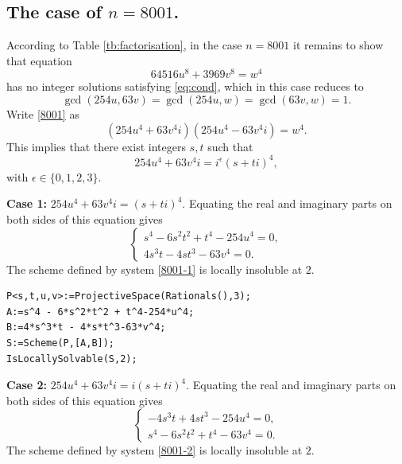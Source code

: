 \documentclass[a4paper,12pt,english,reqno]{amsart}
\begin{document}
\subsection{The case of $n=8001$.}%
 According to Table \ref{tb:factorisation}, in the case $n=8001$ it remains to
show that equation
\begin{equation}\label{8001}
64516 u^8 + 3969 v^8= w^4
\end{equation}
has no integer solutions satisfying \eqref{eq:cond}, which in this case reduces to  \[\gcd(254u,63v)=\gcd(254u,w)=\gcd(63v,w)=1.\]
Write \eqref{8001} as 
\begin{equation} (254u^4+63v^4i)(254u^4-63v^4i)=w^4.
\end{equation}
This implies that there exist integers $s,t$ such that 
\[254u^4+63v^4i=i^{\epsilon}(s+ti)^4,\]
with $\epsilon \in \{0,1,2,3\}$.


{\bf Case 1:} $254u^4+63v^4i=(s+ti)^4$. Equating the real and imaginary parts on both sides of this equation gives
\begin{equation}\label{8001-1}
\begin{cases}
s^4 - 6s^2t^2 + t^4 - 254u^4=0,\\
4s^3t - 4st^3 - 63v^4=0.
\end{cases}
\end{equation}
The scheme defined by system \eqref{8001-1} is locally insoluble at $2$.


\begin{lstlisting}
P<s,t,u,v>:=ProjectiveSpace(Rationals(),3);
A:=s^4 - 6*s^2*t^2 + t^4-254*u^4;
B:=4*s^3*t - 4*s*t^3-63*v^4;
S:=Scheme(P,[A,B]);
IsLocallySolvable(S,2);
\end{lstlisting}

{\bf Case 2:} $254u^4+63v^4i=i(s+ti)^4$. Equating the real and imaginary parts on both sides of this equation gives
\begin{equation}\label{8001-2}
\begin{cases}
-4s^3t + 4st^3 - 254u^4=0,\\
s^4 - 6s^2t^2 + t^4 - 63v^4=0.
\end{cases}
\end{equation}
The scheme defined by system \eqref{8001-2} is locally insoluble at $2$.
\end{document}
